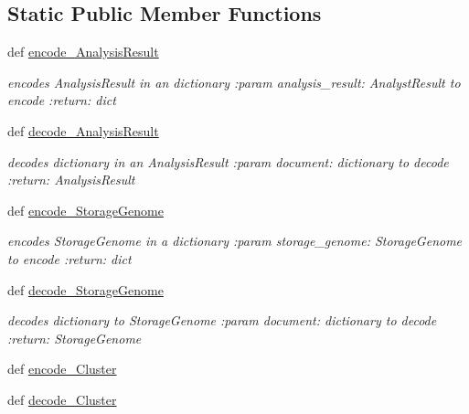 \subsection*{Static Public Member Functions}
\begin{DoxyCompactItemize}
\item 
def \hyperlink{classNEAT__PyGenetics_1_1NEAT_1_1Repository_1_1Transformator_1_1Transformator_a930f3a38fe7754c4c4a950718cf6df99}{encode\+\_\+\+Analysis\+Result}
\begin{DoxyCompactList}\small\item\em encodes Analysis\+Result in an dictionary \+:param analysis\+\_\+result\+: Analyst\+Result to encode \+:return\+: dict \end{DoxyCompactList}\item 
def \hyperlink{classNEAT__PyGenetics_1_1NEAT_1_1Repository_1_1Transformator_1_1Transformator_afa3d18da2509741c7b98b86f6b867c93}{decode\+\_\+\+Analysis\+Result}
\begin{DoxyCompactList}\small\item\em decodes dictionary in an Analysis\+Result \+:param document\+: dictionary to decode \+:return\+: Analysis\+Result \end{DoxyCompactList}\item 
def \hyperlink{classNEAT__PyGenetics_1_1NEAT_1_1Repository_1_1Transformator_1_1Transformator_a5c4155f4acbb4c8cf532e1fccc9b2e47}{encode\+\_\+\+Storage\+Genome}
\begin{DoxyCompactList}\small\item\em encodes Storage\+Genome in a dictionary \+:param storage\+\_\+genome\+: Storage\+Genome to encode \+:return\+: dict \end{DoxyCompactList}\item 
def \hyperlink{classNEAT__PyGenetics_1_1NEAT_1_1Repository_1_1Transformator_1_1Transformator_acc9bbdb90961f5952e142967fadb8792}{decode\+\_\+\+Storage\+Genome}
\begin{DoxyCompactList}\small\item\em decodes dictionary to Storage\+Genome \+:param document\+: dictionary to decode \+:return\+: Storage\+Genome \end{DoxyCompactList}\item 
def \hyperlink{classNEAT__PyGenetics_1_1NEAT_1_1Repository_1_1Transformator_1_1Transformator_ae51de8a47210d94df0d81d170cd81998}{encode\+\_\+\+Cluster}
\item 
def \hyperlink{classNEAT__PyGenetics_1_1NEAT_1_1Repository_1_1Transformator_1_1Transformator_a8671f5ca051f20dbdd948c8689a6019c}{decode\+\_\+\+Cluster}
\end{DoxyCompactItemize}


